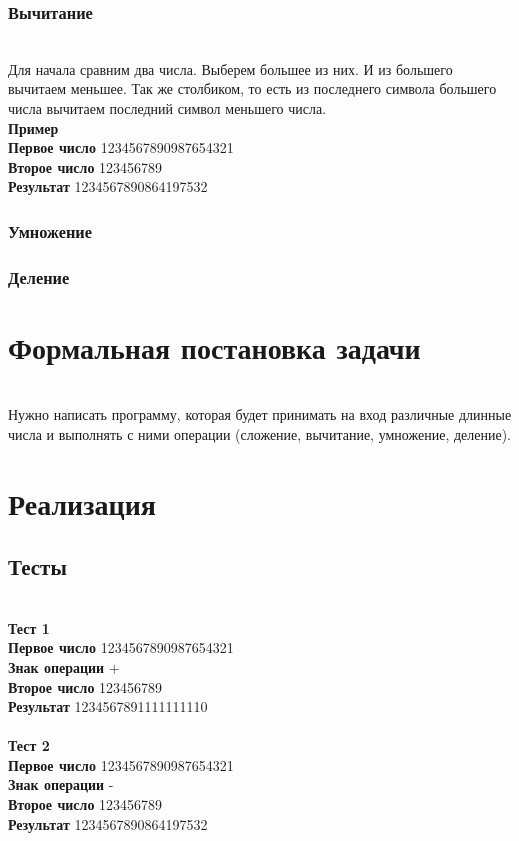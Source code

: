 \documentclass[a4paper]{article}
\begin{document}
\subsubsection{Вычитание}
\\Для начала сравним два числа. Выберем большее из них. И из большего вычитаем меньшее. Так же столбиком, то есть из последнего символа большего числа вычитаем последний символ меньшего числа.
\\ \textbf{Пример}
\\ \textbf{Первое число} 1234567890987654321
\\ \textbf{Второе число} 123456789
\\ \textbf{Результат} 1234567890864197532

\subsubsection{Умножение}

\subsubsection{Деление}

\newpage

\section{Формальная постановка задачи}
\\Нужно написать программу, которая будет принимать на вход различные длинные числа и выполнять с ними операции (сложение, вычитание, умножение, деление).
\newpage

\section{Реализация}

\subsection{Тесты}
\\ \textbf{Тест 1}
\\ \textbf{Первое число} 1234567890987654321
\\ \textbf{Знак операции} +
\\ \textbf{Второе число} 123456789
\\ \textbf{Результат} 1234567891111111110
\\
\\ \textbf{Тест 2}
\\ \textbf{Первое число} 1234567890987654321
\\ \textbf{Знак операции} -
\\ \textbf{Второе число} 123456789
\\ \textbf{Результат} 1234567890864197532
\end{document}
